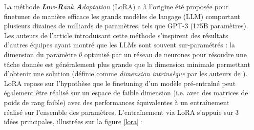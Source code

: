 \documentclass{article}
\begin{document}
La méthode \textit{\textbf{Lo}w-\textbf{R}ank \textbf{A}daptation} (LoRA) a à l'origine été proposée pour finetuner de manière efficace les grands modèles de langage (LLM) comportant plusieurs dizaines de milliards de paramètres, tels que GPT-3 (175B paramètres). Les auteurs de l'article introduisant cette méthode \cite{LoRA} s'inspirent des résultats d'autres équipes \cite{li2018measuring} \cite{aghajanyan2020intrinsic} ayant montré que les LLMs sont souvent sur-paramétrés : la dimension du paramètre $\theta$ optimisé par un réseau de neurones pour résoudre une tâche donnée est généralement plus grande que la dimension minimale permettant d'obtenir une solution (définie comme \textit{dimension intrinsèque} par les auteurs de \cite{li2018measuring}). LoRA repose sur l'hypothèse que le finetuning d'un modèle pré-entraîné peut également être réalisé sur un espace de faible dimension (i.e. avec des matrices de poids de rang faible) avec des performances équivalentes à un entraînement réalisé sur l'ensemble des paramètres. L'entraînement via LoRA s'appuie sur 3 idées principales, illustrées sur la figure \ref{lora} :
\end{document}
